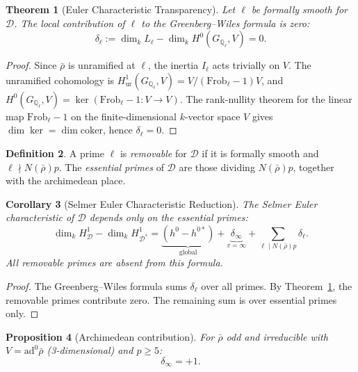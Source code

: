 \documentclass[12pt]{amsart}
\newtheorem{theorem}{Theorem}[section]
\newtheorem{proposition}[theorem]{Proposition}
\newtheorem{corollary}[theorem]{Corollary}
\theoremstyle{definition}
\newtheorem{definition}[theorem]{Definition}
\theoremstyle{remark}
\newcommand{\ad}{\mathrm{ad}}
\newcommand{\Frob}{\mathrm{Frob}}
\newcommand{\rhobar}{\bar{\rho}}
\newcommand{\GQl}{G_{\mathbb{Q}_\ell}}
\begin{document}
\begin{theorem}[Euler Characteristic Transparency]\label{thm:transparency}
Let $\ell$ be formally smooth for $\mathcal{D}$. The local contribution of $\ell$ to the Greenberg--Wiles formula is zero:
$$\delta_\ell := \dim_k L_\ell - \dim_k H^0(\GQl, V) = 0.$$
\end{theorem}

\begin{proof}
Since $\rhobar$ is unramified at $\ell$, the inertia $I_\ell$ acts trivially on $V$. The unramified cohomology is $H^1_{\mathrm{ur}}(\GQl, V) = V / (\Frob_\ell - 1)V$, and $H^0(\GQl, V) = \ker(\Frob_\ell - 1 : V \to V)$. The rank-nullity theorem for the linear map $\Frob_\ell - 1$ on the finite-dimensional $k$-vector space $V$ gives $\dim \ker = \dim \mathrm{coker}$, hence $\delta_\ell = 0$.
\end{proof}

\begin{definition}
A prime $\ell$ is \emph{removable} for $\mathcal{D}$ if it is formally smooth and $\ell \nmid N(\rhobar) p$. The \emph{essential primes} of $\mathcal{D}$ are those dividing $N(\rhobar) p$, together with the archimedean place.
\end{definition}

\begin{corollary}[Selmer Euler Characteristic Reduction]\label{cor:reduction}
The Selmer Euler characteristic of $\mathcal{D}$ depends only on the essential primes:
\begin{equation}\label{eq:euler}
\dim_k H^1_{\mathcal{D}} - \dim_k H^1_{\mathcal{D}^*} = \underbrace{(h^0 - h^{0*})}_{\text{global}} + \underbrace{\delta_\infty}_{v = \infty} + \sum_{\ell \mid N(\rhobar) p} \delta_\ell.
\end{equation}
All removable primes are absent from this formula.
\end{corollary}

\begin{proof}
The Greenberg--Wiles formula sums $\delta_\ell$ over all primes. By Theorem~\ref{thm:transparency}, the removable primes contribute zero. The remaining sum is over essential primes only.
\end{proof}

\begin{proposition}[Archimedean contribution]\label{prop:arch}
For $\rhobar$ odd and irreducible with $V = \ad^0\rhobar$ (3-dimensional) and $p \geq 5$:
$$\delta_\infty = +1.$$
\end{proposition}
\end{document}
